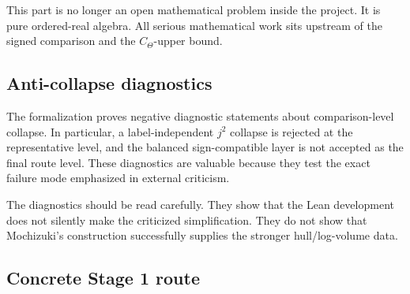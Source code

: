 \documentclass[11pt]{article}
\newcommand{\CTheta}{C_\Theta}
\theoremstyle{plain}
\theoremstyle{definition}
\theoremstyle{remark}
\begin{document}
This part is no longer an open mathematical problem inside the project.  It is
pure ordered-real algebra.  All serious mathematical work sits upstream of the
signed comparison and the \(\CTheta\)-upper bound.

\subsection{Anti-collapse diagnostics}

The formalization proves negative diagnostic statements about comparison-level
collapse.  In particular, a label-independent \(j^2\) collapse is rejected at
the representative level, and the balanced sign-compatible layer is not
accepted as the final route level.  These diagnostics are valuable because they
test the exact failure mode emphasized in external criticism.

The diagnostics should be read carefully.  They show that the Lean development
does not silently make the criticized simplification.  They do not show that
Mochizuki's construction successfully supplies the stronger hull/log-volume
data.

\subsection{Concrete Stage 1 route}
\end{document}
